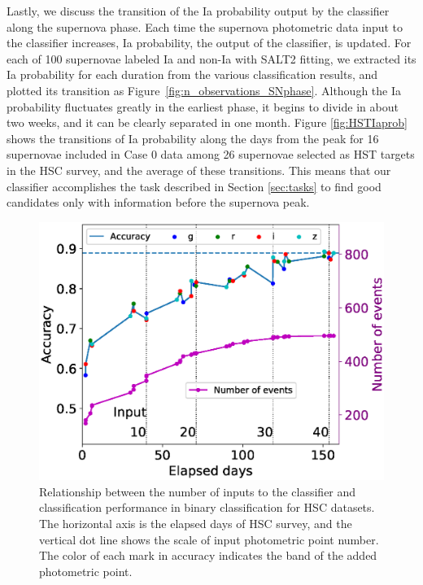 \documentclass[useamsfonts]{pasj01}
\begin{document}
Lastly, we discuss the transition of the Ia probability output by the classifier along the supernova phase.
Each time the supernova photometric data input to the classifier increases, Ia probability, the output of the classifier, is updated.
For each of 100 supernovae labeled Ia and non-Ia with SALT2 fitting, we extracted its Ia probability for each duration from the various classification results, and plotted its transition as Figure\ \ref{fig:n_observations_SNphase}.
Although the Ia probability fluctuates greatly in the earliest phase, it begins to divide in about two weeks, and it can be clearly separated in one month.
Figure \ref{fig:HSTIaprob} shows the transitions of Ia probability along the days from the peak for 16 supernovae included in Case 0 data among 26 supernovae selected as HST targets in the HSC survey, and the average of these transitions.
This means that our classifier accomplishes the task described in Section \ref{sec:tasks} to find good candidates only with information before the supernova peak.
%
\begin{figure}[ht]
  \begin{center}
     \includegraphics[width=\columnwidth]{figures/n_observations_v2.eps}
  \end{center}
  \caption{%
  Relationship between the number of inputs to the classifier and classification performance in binary classification for HSC datasets. 
  The horizontal axis is the elapsed days of HSC survey, and the vertical dot line shows the scale of input photometric point number. 
  The color of each mark in accuracy indicates the band of the added photometric point.
  }%
  \label{fig:n_observations}
\end{figure}
\end{document}

